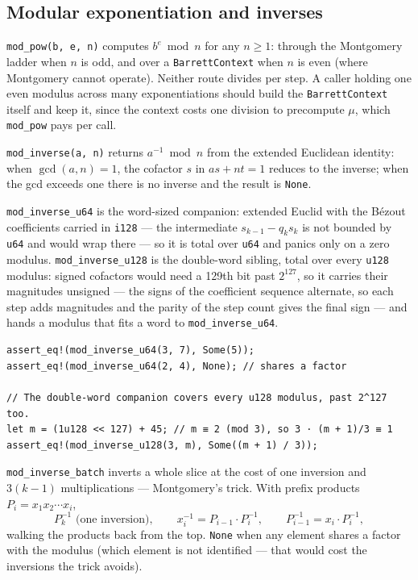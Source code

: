 \documentclass[11pt]{article}
\newcommand{\code}[1]{\texttt{#1}}
\begin{document}
\subsection{Modular exponentiation and inverses}

\code{mod\_pow(b, e, n)} computes $b^e \bmod n$ for any $n \ge 1$: through
the Montgomery ladder when $n$ is odd, and over a \code{BarrettContext} when
$n$ is even (where Montgomery cannot operate). Neither route divides per
step. A caller holding one even modulus across many exponentiations should
build the \code{BarrettContext} itself and keep it, since the context costs one
division to precompute $\mu$, which \code{mod\_pow} pays per call.

\code{mod\_inverse(a, n)} returns $a^{-1} \bmod n$ from the extended
Euclidean identity: when $\gcd(a, n) = 1$, the cofactor $s$ in
$as + nt = 1$ reduces to the inverse; when the gcd exceeds one there is no
inverse and the result is \code{None}.

\code{mod\_inverse\_u64} is the word-sized companion: extended Euclid
with the B\'ezout coefficients carried in \code{i128} --- the intermediate
$s_{k-1} - q_k s_k$ is not bounded by \code{u64} and would wrap there ---
so it is total over \code{u64} and panics only on a zero modulus.
\code{mod\_inverse\_u128} is the double-word sibling, total over every
\code{u128} modulus: signed cofactors would need a 129th bit past $2^{127}$,
so it carries their magnitudes unsigned --- the signs of the coefficient
sequence alternate, so each step adds magnitudes and the parity of the step
count gives the final sign --- and hands a modulus that fits a word to
\code{mod\_inverse\_u64}.

\begin{lstlisting}
assert_eq!(mod_inverse_u64(3, 7), Some(5));
assert_eq!(mod_inverse_u64(2, 4), None); // shares a factor

// The double-word companion covers every u128 modulus, past 2^127 too.
let m = (1u128 << 127) + 45; // m ≡ 2 (mod 3), so 3 · (m + 1)/3 ≡ 1
assert_eq!(mod_inverse_u128(3, m), Some((m + 1) / 3));
\end{lstlisting}

\code{mod\_inverse\_batch} inverts a whole slice at the cost of one
inversion and $3(k-1)$ multiplications --- Montgomery's trick. With prefix
products $P_i = x_1 x_2 \cdots x_i$,
\begin{equation}
P_k^{-1} \text{ (one inversion)}, \qquad
x_i^{-1} = P_{i-1} \cdot P_i^{-1}, \qquad
P_{i-1}^{-1} = x_i \cdot P_i^{-1},
\end{equation}
walking the products back from the top. \code{None} when any element
shares a factor with the modulus (which element is not identified --- that
would cost the inversions the trick avoids).
\end{document}
